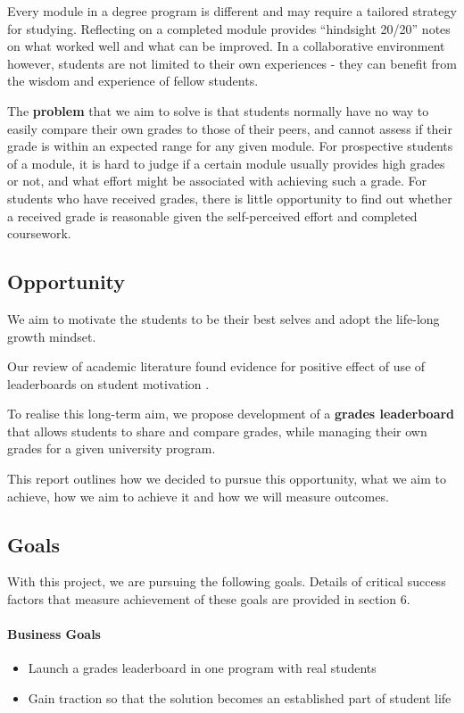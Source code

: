 Every module in a degree program is different and may require a tailored strategy for studying. Reflecting on a completed module provides “hindsight 20/20” notes on what worked well and what can be improved. In a collaborative environment however, students are not limited to their own experiences - they can benefit from the wisdom and experience of fellow students.


The \textbf{problem} that we aim to solve is that students normally have no way to easily compare their own grades to those of their peers, and cannot assess if their grade is within an expected range for any given module. For prospective students of a module, it is hard to judge if a certain module usually provides high grades or not, and what effort might be associated with achieving such a grade. For students who have received grades, there is little opportunity to find out whether a received grade is reasonable given the self-perceived effort and completed coursework.

\subsection{Opportunity}

We aim to motivate the students to be their best selves and adopt the life-long growth mindset.

Our review of academic literature found evidence for positive effect of use of leaderboards on student motivation \cite{chiu_effects_2017} \cite{jia_designing_2017}.

To realise this long-term aim, we propose development of a \textbf{grades leaderboard} that allows students to share and compare grades, while managing their own grades for a given university program. 

This report outlines how we decided to pursue this opportunity, what we aim to achieve, how we aim to achieve it and how we will measure outcomes.

\subsection{Goals}
With this project, we are pursuing the following goals. Details of critical success factors that measure achievement of these goals are provided in section 6.

\paragraph{Business Goals}
\begin{itemize}
    \item Launch a grades leaderboard in one program with real students
    \item Gain traction so that the solution becomes an established part of student life
\end{itemize}

